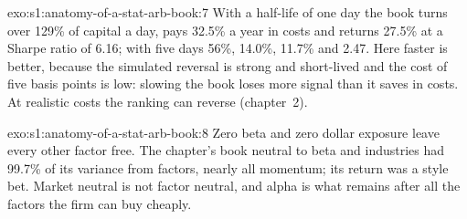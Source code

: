 \begin{solution}{exo:s1:anatomy-of-a-stat-arb-book:7}
With a half-life of one day the book turns over 129\% of capital a day, pays 32.5\% a year in costs and returns 27.5\% at a Sharpe ratio of 6.16; with five days
56\%, 14.0\%, 11.7\% and 2.47. Here faster is better, because the simulated reversal is strong and short-lived and the cost of five basis points is low: slowing
the book loses more signal than it saves in costs. At realistic costs the ranking can reverse (chapter~2).
\end{solution}

\begin{solution}{exo:s1:anatomy-of-a-stat-arb-book:8}
Zero beta and zero dollar exposure leave every other factor free. The chapter's book neutral to beta and industries had 99.7\% of its variance from factors,
nearly all momentum; its return was a style bet. Market neutral is not factor neutral, and alpha is what remains after all the factors the firm can buy
cheaply.
\end{solution}

